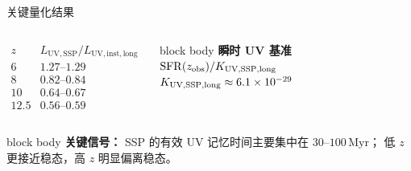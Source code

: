 \documentclass[aspectratio=169,11pt]{beamer}
\begin{document}
\begin{frame}{关键量化结果}
\begin{columns}[T,onlytextwidth]
  \centering
  \Large
  \[
  \begin{array}{c|c}
  z & L_{\mathrm{UV,SSP}} / L_{\mathrm{UV,inst,long}} \\
  \hline
  6 & 1.27\text{--}1.29 \\
  8 & 0.82\text{--}0.84 \\
  10 & 0.64\text{--}0.67 \\
  12.5 & 0.56\text{--}0.59
  \end{array}
  \]

  \begin{beamercolorbox}[rounded=true, sep=0.65em, wd=\linewidth]{block body}
    \Large
    \textbf{瞬时 UV 基准}\\[0.3em]
    \centering
    \Large
    $\mathrm{SFR}(z_{\rm obs}) / K_{\rm UV,SSP,long}$\\[0.8em]
    \normalsize
    $K_{\rm UV,SSP,long} \approx 6.1\times10^{-29}$
  \end{beamercolorbox}
\end{columns}

\vspace{0.8em}

\begin{beamercolorbox}[rounded=true, sep=0.8em, wd=0.94\linewidth, center]{block body}
  \normalsize
  \textbf{关键信号：}
  SSP 的有效 UV 记忆时间主要集中在 \(30\)–\(100\,\mathrm{Myr}\)；
  低 \(z\) 更接近稳态，高 \(z\) 明显偏离稳态。
\end{beamercolorbox}
\end{frame}
\end{document}
